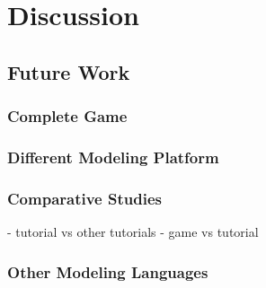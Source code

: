 \chapter{Discussion}
\label{ch:discussion}





\section{Future Work}
\label{sec:future_work}

\subsection{Complete Game}


\subsection{Different Modeling Platform}


\subsection{Comparative Studies}

- tutorial vs other tutorials
- game vs tutorial


\subsection{Other Modeling Languages}